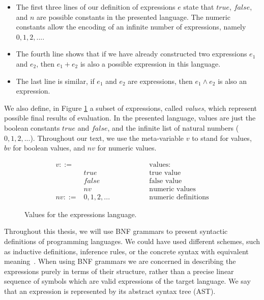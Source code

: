 \documentclass[tese,capa,english]{texufpel}
\begin{document}
\begin{itemize}
\item The first three lines of our definition of expressions $e$ state that $true$, $false$, and $n$ are possible constants in the presented language. The numeric constants allow the encoding of an infinite number of expressions, namely $0, 1, 2, ...$.
\item The fourth line shows that if we have already constructed two expressions $e_1$ and $e_2$, then $e_1 + e_2$ is also a possible expression in this language.
\item The last line is similar, if $e_1$ and $e_2$ are expressions, then $e_1 \wedge e_2$ is also an expression.
\end{itemize}

We also define, in Figure \ref{fig:synvalues} a subset of expressions, called \emph{values}, which represent possible final results of evaluation. In the presented language, values are just the boolean constants $true$ and $false$, and the infinite list of natural numbers ($0, 1, 2, ...$). Throughout our text, we use the meta-variable $v$ to stand for values, $bv$ for boolean values, and $nv$ for numeric values.

\begin{figure}[!htb]
\[
\begin{array}{llr}
  v ::= & \ \ \ \ \ \ \ \ \ \ \ \ \ \ \ \ \ \ \ \ \ \ \ \ \ \ \ \ \ \ \ \ \ \ \ \ \ \ & \textrm{values: } \\
        & true  & \textrm{true value} \\
        & false & \textrm{false value} \\
        & nv    & \textrm{numeric values} \\
  nv ::= & 0, 1, 2, ... & \textrm{numeric definitions}
\end{array}
\]
\caption{Values for the expressions language.}
\label{fig:synvalues}
\end{figure}

Throughout this thesis, we will use BNF grammars to present syntactic definitions of programming languages. We could have used different schemes, such as inductive definitions, inference rules, or the concrete syntax with equivalent meaning~\cite{Pierce:2002:TPL:509043}. When using BNF grammars we are concerned in describing the expressions purely in terms of their structure, rather than a precise linear sequence of symbols which are valid expressions of the target language. We say that an expression is represented by its abstract syntax tree (AST).
\end{document}
